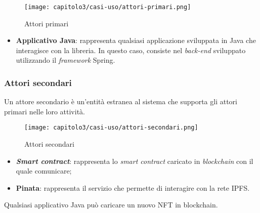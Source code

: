 \begin{figure}[h!]
  \centering
  \texttt{[image: capitolo3/casi-uso/attori-primari.png]}
  \caption{Attori primari}
\end{figure}

\begin{itemize}
  \item \textbf{Applicativo Java}: rappresenta qualsiasi applicazione sviluppata in Java che interagisce con la libreria. In questo caso, consiste nel \textit{back-end} sviluppato utilizzando il \textit{framework} Spring.
\end{itemize}

\subsubsection{Attori secondari}
Un attore secondario è un'entità estranea al sistema che supporta gli attori primari nelle loro attività.

\begin{figure}[h!]
  \centering
  \texttt{[image: capitolo3/casi-uso/attori-secondari.png]}
  \caption{Attori secondari}
\end{figure}

\begin{itemize}
  \item \textbf{\textit{Smart contract}}: rappresenta lo \textit{smart contract} caricato in \textit{blockchain} con il quale comunicare;
  \item \textbf{Pinata}: rappresenta il servizio che permette di interagire con la rete IPFS.
\end{itemize}

\label{UC:upload-new-nft}

Qualsiasi applicativo Java può caricare un nuovo NFT in blockchain.

